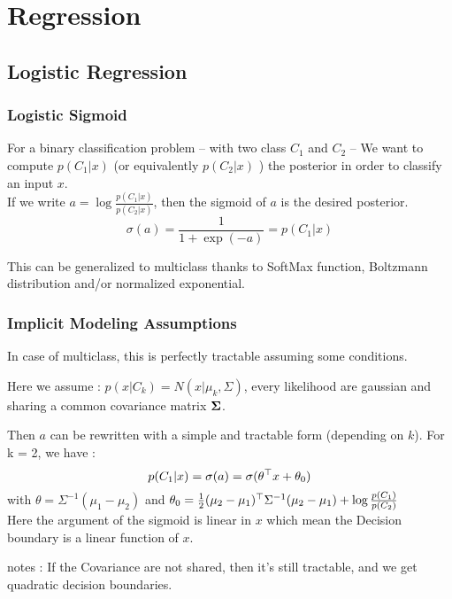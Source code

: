 \chapter{Regression} %
\label{cha:regression}

	\section{Logistic Regression}


		\subsection{Logistic Sigmoid}

			For a binary classification problem -- with two class $C_1$ and $C_2$ -- We want to compute $p(C_1 | x)$ (or equivalently $p(C_2 | x)$ ) the posterior in order to classify an input $x$. \\
			If we write $a = \log\frac{p(C_1 | x)}{p(C_2 | x)}$, then the sigmoid of $a$ is the desired posterior. 
			\[
				\sigma(a) = \frac{1}{1 + \exp(-a) }= p(C_1 |x)
			\]

			This can be generalized to multiclass thanks to SoftMax function, Boltzmann distribution and/or normalized exponential.

		\subsection{Implicit Modeling Assumptions}

			In case of multiclass, this is perfectly tractable assuming some conditions. 

			Here we assume : $p(x|C_k) = \mathit{N}(x |\mu_k, \Sigma)$, every likelihood are gaussian and sharing a common covariance matrix ${\boldsymbol{{\Sigma}}}$.

			Then $a$ can be rewritten with a simple and tractable form (depending on $k$). For k = 2, we have :
			\[
				p(C_1 | x) = \sigma(a) = \sigma(\theta ^\top x + \theta_0)
			\]
			with $\theta = \Sigma^{-1}(\mu_1 -\mu_2)$ and $\theta_0 = \frac{1}{2}(\mu_2 -	\mu_1) ^\top \Sigma^{-1}(\mu_2 - \mu_1) + \log \frac{p(C_1)}{p(C_2)} $\\
			Here the argument of the sigmoid is linear in $x$ which mean the Decision boundary is a linear function of $x$.

			notes : If the Covariance are not shared, then it's still tractable, and we get quadratic decision boundaries.

